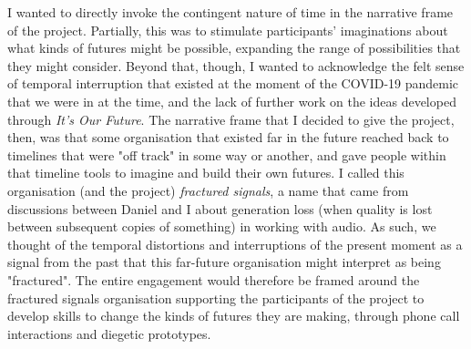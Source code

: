 I wanted to directly invoke the contingent nature of time in the narrative frame of the project. Partially, this was to stimulate participants' imaginations about what kinds of futures might be possible, expanding the range of possibilities that they might consider. Beyond that, though, I wanted to acknowledge the felt sense of temporal interruption that existed at the moment of the COVID-19 pandemic that we were in at the time, and the lack of further work on the ideas developed through \emph{It's Our Future}. The narrative frame that I decided to give the project, then, was that some organisation that existed far in the future reached back to timelines that were "off track" in some way or another, and gave people within that timeline tools to imagine and build their own futures. I called this organisation (and the project) \emph{fractured signals}, a name that came from discussions between Daniel and I about generation loss (when quality is lost between subsequent copies of something) in working with audio. As such, we thought of the temporal distortions and interruptions of the present moment as a signal from the past that this far-future organisation might interpret as being "fractured". The entire engagement would therefore be framed around the fractured signals organisation supporting the participants of the project to develop skills to change the kinds of futures they are making, through phone call interactions and diegetic prototypes.    

